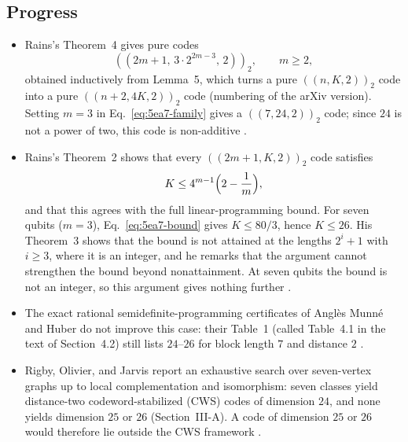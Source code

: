 \subsection*{Progress}

\begin{itemize}
  \item Rains's Theorem~4 gives pure codes
  \begin{equation}
    ((2m+1,\,3\cdot2^{2m-3},\,2))_2,\qquad m\geq2,
    \label{eq:5ea7-family}
  \end{equation}
  obtained inductively from Lemma~5, which turns a pure $((n,K,2))_2$ code into a
  pure $((n+2,4K,2))_2$ code (numbering of the arXiv version).  Setting $m=3$ in
  Eq.~\eqref{eq:5ea7-family} gives a $((7,24,2))_2$ code; since $24$ is not a
  power of two, this code is non-additive
  .

  \item Rains's Theorem~2 shows that every $((2m+1,K,2))_2$ code satisfies
  \begin{equation}
    K\leq4^{m-1}\Bigl(2-\frac1m\Bigr),
    \label{eq:5ea7-bound}
  \end{equation}
  and that this agrees with the full linear-programming bound.  For seven qubits
  ($m=3$), Eq.~\eqref{eq:5ea7-bound} gives $K\leq80/3$, hence $K\leq26$.  His
  Theorem~3 shows that the bound is not attained at the lengths $2^i+1$ with
  $i\geq3$, where it is an integer, and he remarks that the argument cannot
  strengthen the bound beyond nonattainment.  At seven qubits the bound is not
  an integer, so this argument gives nothing further
  .

  \item The exact rational semidefinite-programming certificates of Angl\`es Munn\'e
  and Huber do not improve this case: their Table~1 (called Table~4.1 in the
  text of Section~4.2) still lists $24$--$26$ for block length $7$ and distance
  $2$ .

  \item Rigby, Olivier, and Jarvis report an exhaustive search over seven-vertex
  graphs up to local complementation and isomorphism: seven classes yield
  distance-two codeword-stabilized (CWS) codes of dimension $24$, and none yields
  dimension $25$ or $26$ (Section~III-A).  A code of dimension $25$ or $26$
  would therefore lie outside the CWS framework
  .


\end{itemize}
